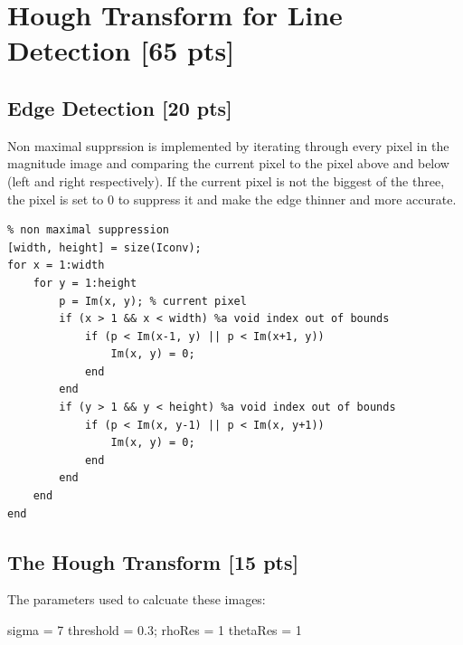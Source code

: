 \documentclass[12pt,a4paper]{article}
\begin{document}
\cite{parabola}


\section{Hough Transform for Line Detection [65 pts]}


\subsection{Edge Detection [20 pts]}
Non maximal supprssion is implemented by iterating through every pixel in the magnitude image and comparing the current pixel to the pixel above and below (left and right respectively). If the current pixel is not the biggest of the three, the pixel is set to 0 to suppress it and make the edge thinner and more accurate.

\begin{lstlisting}
% non maximal suppression
[width, height] = size(Iconv);
for x = 1:width
    for y = 1:height
        p = Im(x, y); % current pixel
        if (x > 1 && x < width) %a void index out of bounds
            if (p < Im(x-1, y) || p < Im(x+1, y))
                Im(x, y) = 0;
            end
        end
        if (y > 1 && y < height) %a void index out of bounds
            if (p < Im(x, y-1) || p < Im(x, y+1))
                Im(x, y) = 0;
            end
        end
    end
end
\end{lstlisting}


\subsection{The Hough Transform [15 pts]}
The parameters used to calcuate these images:

sigma     = 7
threshold = 0.3;
rhoRes    = 1
thetaRes  = 1
\end{document}
